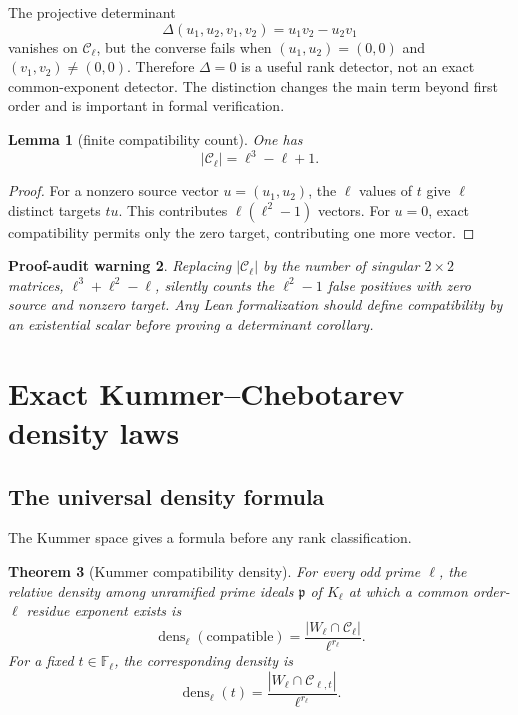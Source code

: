 \documentclass[11pt,oneside]{article}
\newtheorem{theorem}{Theorem}[section]
\newtheorem{lemma}[theorem]{Lemma}
\newtheorem{warning}[theorem]{Proof-audit warning}
\theoremstyle{definition}
\theoremstyle{remark}
\newcommand{\F}{\mathbb{F}}
\newcommand{\dens}{\operatorname{dens}}
\begin{document}
The projective determinant
\begin{equation}\label{eq:Delta}
 \Delta(u_1,u_2,v_1,v_2)=u_1v_2-u_2v_1
\end{equation}
vanishes on $\mathcal C_\ell$, but the converse fails when
$(u_1,u_2)=(0,0)$ and $(v_1,v_2)\ne(0,0)$.  Therefore
$\Delta=0$ is a useful rank detector, not an exact common-exponent detector.
The distinction changes the main term beyond first order and is important in
formal verification.

\begin{lemma}[finite compatibility count]\label{lem:C-count}
One has
\[
 |\mathcal C_\ell|=\ell^3-\ell+1.
\]
\end{lemma}

\begin{proof}
For a nonzero source vector $u=(u_1,u_2)$, the $\ell$ values of $t$ give
$\ell$ distinct targets $tu$.  This contributes
$\ell(\ell^2-1)$ vectors.  For $u=0$, exact compatibility permits only the
zero target, contributing one more vector.
\end{proof}

\begin{warning}\label{warn:det-not-exact}
Replacing $|\mathcal C_\ell|$ by the number of singular $2\times2$ matrices,
$\ell^3+\ell^2-\ell$, silently counts the $\ell^2-1$ false positives with
zero source and nonzero target.  Any Lean formalization should define
compatibility by an existential scalar before proving a determinant
corollary.
\end{warning}

\section{Exact Kummer--Chebotarev density laws}\label{sec:kummer-density}

\subsection{The universal density formula}

The Kummer space gives a formula before any rank classification.

\begin{theorem}[Kummer compatibility density]\label{thm:universal-density}
For every odd prime $\ell$, the relative density among unramified prime
ideals $\mathfrak p$ of $K_\ell$ at which a common order-$\ell$ residue
exponent exists is
\begin{equation}\label{eq:universal-density}
 \dens_\ell(\mathrm{compatible})
 =\frac{|W_\ell\cap\mathcal C_\ell|}{\ell^{r_\ell}}.
\end{equation}
For a fixed $t\in\F_\ell$, the corresponding density is
\[
 \dens_\ell(t)=
 \frac{|W_\ell\cap\mathcal C_{\ell,t}|}{\ell^{r_\ell}}.
\]
\end{theorem}
\end{document}
